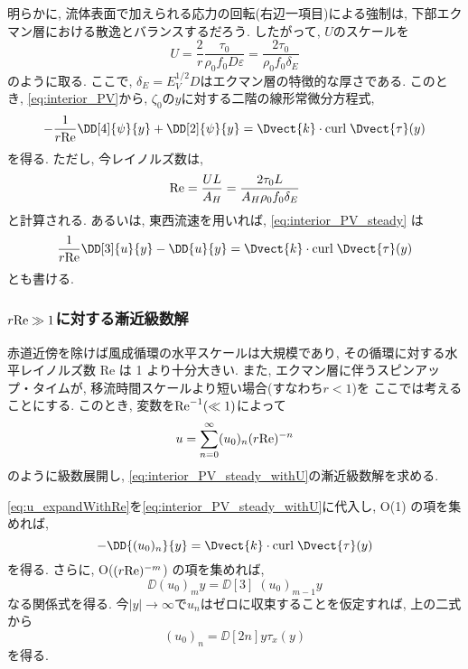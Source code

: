 明らかに, 流体表面で加えられる応力の回転(右辺一項目)による強制は, 下部エクマン層における散逸とバランスするだろう. 
したがって, $U$のスケールを
\begin{equation}
  U = \dfrac{2}{r} \dfrac{\tau_0}{\rho_0 f_0 D \varepsilon}  = \dfrac{2 \tau_0}{\rho_0 f_0 \delta_E}
\end{equation}
のように取る. 
ここで, $\delta_E = E_V^{1/2} D$はエクマン層の特徴的な厚さである. 
このとき, \eqref{eq:interior_PV}から, $\zeta_0$の$y$に対する二階の線形常微分方程式,  
\begin{equation}
  - \dfrac{1}{r {\rm Re}}\DD[4]{\psi}{y} + \DD[2]{\psi}{y} = \Dvect{k} \cdot {\rm curl} \; \Dvect{\tau}(y)
\label{eq:interior_PV_steady}
\end{equation}
を得る. 
ただし, 今レイノルズ数は, 
\begin{equation}
   {\rm Re} = \dfrac{UL}{A_H} = \dfrac{2 \tau_0 L}{A_H \rho_0 f_0 \delta_E}
\end{equation}
と計算される. 
あるいは, 東西流速を用いれば, \eqref{eq:interior_PV_steady} は
\begin{equation}
   \dfrac{1}{r {\rm Re}}\DD[3]{u}{y} - \DD{u}{y} 
  = \Dvect{k} \cdot {\rm curl} \; \Dvect{\tau}(y)
\label{eq:interior_PV_steady_withU}
\end{equation}
とも書ける. 

\subsubsection*{$r {\rm Re} \gg 1$に対する漸近級数解}
赤道近傍を除けば風成循環の水平スケールは大規模であり, 
その循環に対する水平レイノルズ数 Re は 1 より十分大きい. 
また, エクマン層に伴うスピンアップ・タイムが, 移流時間スケールより短い場合(すなわち$r < 1$)を
ここでは考えることにする. 
このとき, 変数を${\rm Re}^{-1} (\ll 1)$によって
\begin{equation}
   u = \sum_{n=0}^\infty (u_0)_n (r {\rm Re})^{-n}
\label{eq:u_expandWithRe}
\end{equation}
のように級数展開し, 
\eqref{eq:interior_PV_steady_withU}の漸近級数解を求める. 

\eqref{eq:u_expandWithRe}を\eqref{eq:interior_PV_steady_withU}に代入し, 
O(1) の項を集めれば, 
\begin{equation}
  - \DD{(u_0)_n}{y} 
  = \Dvect{k} \cdot {\rm curl} \; \Dvect{\tau}(y) 
 \end{equation}
を得る. 
さらに, O($(r {\rm Re})^{-m}$) の項を集めれば, 
\begin{equation}
  \DD{(u_0)_{m}}{y} = \DD[3]{\; (u_0)_{m-1}}{y}
\end{equation}
なる関係式を得る. 
今$|y| \to \infty$で$u_n$はゼロに収束することを仮定すれば, 
上の二式から
\begin{equation}
  (u_0)_n = \DD[2n]{}{y} \tau_x(y)
\end{equation}
を得る. 